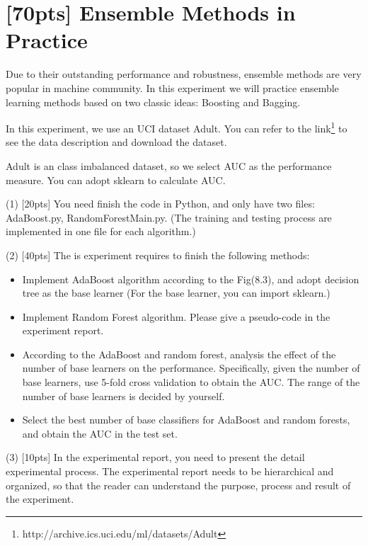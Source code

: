 \documentclass{article}
\begin{document}
	\newpage
	\section{[70pts] Ensemble Methods in Practice}
	
	Due to their outstanding performance and robustness, ensemble methods are very popular in machine community. In this experiment we will practice ensemble learning methods based on two classic
	ideas: Boosting and Bagging.
	
	In this experiment, we use an UCI dataset Adult. You can refer to the link\footnote{http://archive.ics.uci.edu/ml/datasets/Adult} to see the data description and download the dataset.
	
	Adult is an class imbalanced dataset, so we select AUC as the performance measure. You can adopt sklearn to calculate AUC.
	
	(1) [20pts] You need finish the code in Python, and only have two files: AdaBoost.py, RandomForestMain.py. (The training and testing process are implemented in one file for each algorithm.)

	(2) [40pts] The is experiment requires to finish the following methods:
	
	\begin{itemize}
		\item Implement AdaBoost algorithm according to the Fig(8.3), and adopt decision tree as the base learner (For the base learner, you can import sklearn.)
		\item  Implement Random Forest algorithm. Please give a pseudo-code in the experiment report.
		\item According to the AdaBoost and random forest, analysis the effect of the number of base learners on the performance. Specifically, given the number of base learners, use 5-fold cross validation to obtain the AUC. The range of the number of base learners is decided by yourself.
		\item Select the best number of base classifiers for AdaBoost and random forests, and obtain the AUC in the test set.
	\end{itemize}

	(3) [10pts] In the experimental report, you need to present the detail experimental process. The experimental report needs to be hierarchical and organized, so that the reader can understand the purpose, process and result of the experiment.\\
\end{document}
